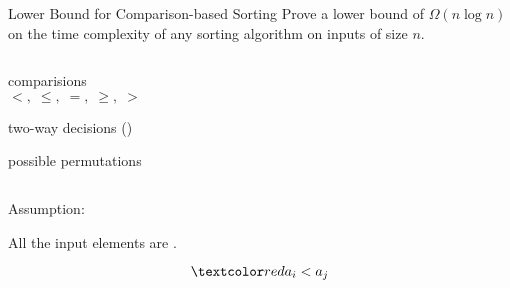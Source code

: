 
\begin{frame}{}
  \centerline{}

\end{frame}

\begin{frame}{}
  \begin{exampleblock}{Lower Bound for Comparison-based Sorting}
    Prove a lower bound of $\Omega(n \log n)$
    on the time complexity of any  sorting 
    algorithm on inputs of size $n$.
  \end{exampleblock}

  \pause
  \vspace{0.30cm}
  \begin{columns}
  \end{columns}
\end{frame}

\begin{frame}{}
  \begin{center}
    {\Large {}} 

    \pause
    \vspace{0.20cm}
    \begin{columns}
	\begin{description}[Leaves:]
	  \item[Nodes:] comparisions 
	    \[
	      <,\; \le,\; =,\; \ge,\; >
	    \]
	  \item[Edges:] two-way decisions ()
	  \item[Leaves:] possible permutations
	\end{description}
    \end{columns}

    \pause
    \vspace{0.60cm}
    \begin{alertblock}{Assumption:}
      \centerline{All the input elements are .}
      \[
		\red{a_i < a_j}
      \]
    \end{alertblock}
  \end{center}
\end{frame}

